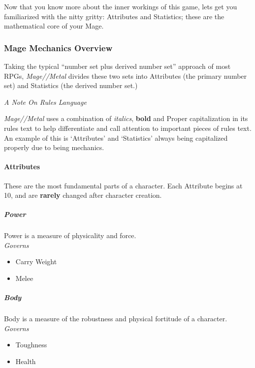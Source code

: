 \documentclass[
]{article}
\providecommand{\tightlist}{%
  \setlength{\itemsep}{0pt}\setlength{\parskip}{0pt}}
\begin{document}
Now that you know more about the inner workings of this game, lets get
you familiarized with the nitty gritty: Attributes and Statistics; these
are the mathematical core of your Mage.

\hypertarget{mage-mechanics-overview}{%
\subsubsection{Mage Mechanics Overview}\label{mage-mechanics-overview}}

Taking the typical ``number set plus derived number set'' approach of
most RPGs, {{\emph{Mage//Metal}}} divides these two sets into Attributes
(the primary number set) and Statistics (the derived number set.)

\emph{A Note On Rules Language}

{{\emph{Mage//Metal}}} uses a combination of \emph{italics},
\textbf{bold} and Proper capitalization in its rules text to help
differentiate and call attention to important pieces of rules text. An
example of this is `Attributes' and `Statistics' always being
capitalized properly due to being mechanics.

\hypertarget{attributes}{%
\paragraph{Attributes}\label{attributes}}

These are the most fundamental parts of a character. Each Attribute
begins at 10, and are \textbf{rarely} changed after character creation.

\hypertarget{power}{%
\subparagraph{Power}\label{power}}

Power is a measure of physicality and force.\\
\emph{Governs}

\begin{itemize}
\tightlist
\item
  Carry Weight
\item
  Melee
\end{itemize}

\hypertarget{body}{%
\subparagraph{Body}\label{body}}

Body is a measure of the robustness and physical fortitude of a
character.\\
\emph{Governs}

\begin{itemize}
\tightlist
\item
  Toughness
\item
  Health
\end{itemize}
\end{document}
